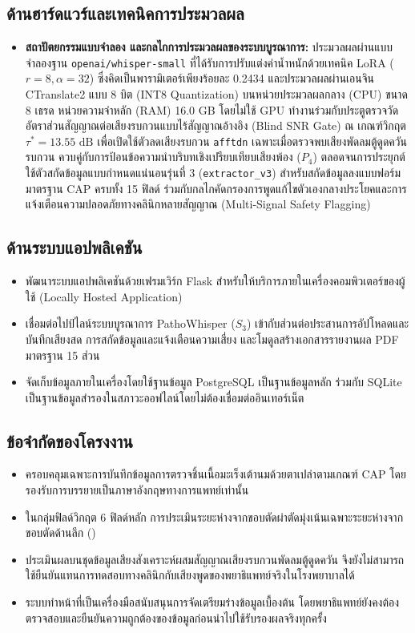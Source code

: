\subsection{ด้านฮาร์ดแวร์และเทคนิคการประมวลผล}
\begin{itemize}
    \item \textbf{สถาปัตยกรรมแบบจำลอง และกลไกการประมวลผลของระบบบูรณาการ:} ประมวลผลผ่านแบบจำลองฐาน \texttt{openai/whisper-small} ที่ได้รับการปรับแต่งค่าน้ำหนักด้วยเทคนิค LoRA ($r = 8, \alpha = 32$) ซึ่งคิดเป็นพารามิเตอร์เพียงร้อยละ 0.2434 และประมวลผลผ่านเอนจิน CTranslate2 แบบ 8 บิต (INT8 Quantization) บนหน่วยประมวลผลกลาง (CPU) ขนาด 8 เธรด หน่วยความจำหลัก (RAM) 16.0 GB โดยไม่ใช้ GPU ทำงานร่วมกับประตูตรวจวัดอัตราส่วนสัญญาณต่อเสียงรบกวนแบบไร้สัญญาณอ้างอิง (Blind SNR Gate) ณ เกณฑ์วิกฤต $\tau^* = 13.55\text{ dB}$ เพื่อเปิดใช้ตัวลดเสียงรบกวน \texttt{afftdn} เฉพาะเมื่อตรวจพบเสียงพัดลมตู้ดูดควันรบกวน ควบคู่กับการป้อนข้อความนำบริบทเชิงเปรียบเทียบเสียงพ้อง ($P_4$) ตลอดจนการประยุกต์ใช้ตัวสกัดข้อมูลแบบกำหนดแน่นอนรุ่นที่ 3 (\texttt{extractor\_v3}) สำหรับสกัดข้อมูลลงแบบฟอร์มมาตรฐาน CAP ครบทั้ง 15 ฟิลด์ ร่วมกับกลไกคัดกรองการพูดแก้ไขตัวเองกลางประโยคและการแจ้งเตือนความปลอดภัยทางคลินิกหลายสัญญาณ (Multi-Signal Safety Flagging)
\end{itemize}


\subsection{ด้านระบบแอปพลิเคชัน}
\begin{itemize}
    \item พัฒนาระบบแอปพลิเคชันด้วยเฟรมเวิร์ก Flask สำหรับให้บริการภายในเครื่องคอมพิวเตอร์ของผู้ใช้ (Locally Hosted Application) 
    \item เชื่อมต่อไปป์ไลน์ระบบบูรณาการ PathoWhisper ($S_3$) เข้ากับส่วนต่อประสานการอัปโหลดและบันทึกเสียงสด การสกัดข้อมูลและแจ้งเตือนความเสี่ยง และโมดูลสร้างเอกสารรายงานผล PDF มาตรฐาน 15 ส่วน
    \item จัดเก็บข้อมูลภายในเครื่องโดยใช้ฐานข้อมูล PostgreSQL เป็นฐานข้อมูลหลัก ร่วมกับ SQLite เป็นฐานข้อมูลสำรองในสภาวะออฟไลน์โดยไม่ต้องเชื่อมต่ออินเทอร์เน็ต
\end{itemize}

\subsection{ข้อจำกัดของโครงงาน}
\begin{itemize}
    \item ครอบคลุมเฉพาะการบันทึกข้อมูลการตรวจชิ้นเนื้อมะเร็งเต้านมด้วยตาเปล่าตามเกณฑ์ CAP โดยรองรับการบรรยายเป็นภาษาอังกฤษทางการแพทย์เท่านั้น
    \item ในกลุ่มฟิลด์วิกฤต 6 ฟิลด์หลัก การประเมินระยะห่างจากขอบตัดผ่าตัดมุ่งเน้นเฉพาะระยะห่างจากขอบตัดด้านลึก ()
    \item ประเมินผลบนชุดข้อมูลเสียงสังเคราะห์ผสมสัญญาณเสียงรบกวนพัดลมตู้ดูดควัน จึงยังไม่สามารถใช้ยืนยันแทนการทดสอบทางคลินิกกับเสียงพูดของพยาธิแพทย์จริงในโรงพยาบาลได้
    \item ระบบทำหน้าที่เป็นเครื่องมือสนับสนุนการจัดเตรียมร่างข้อมูลเบื้องต้น โดยพยาธิแพทย์ยังคงต้องตรวจสอบและยืนยันความถูกต้องของข้อมูลก่อนนำไปใช้รับรองผลจริงทุกครั้ง
\end{itemize}

